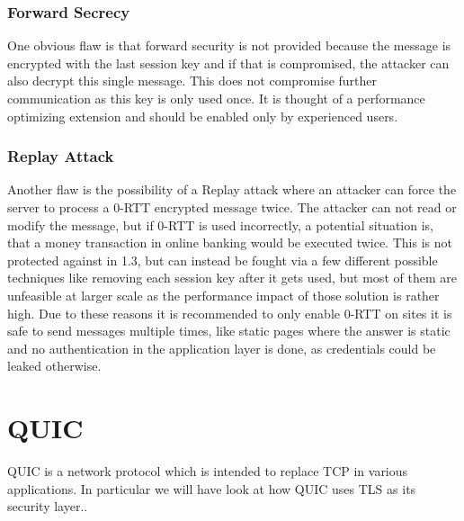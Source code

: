 \documentclass[a4paper,conference]{IEEEtran}
\begin{document}
\subsubsection{Forward Secrecy}
One obvious flaw is that forward security is not provided because the message is encrypted with the last session key and if that is compromised, the attacker can also decrypt this single message. This does not compromise further communication as this key is only used once.
It is thought of a performance optimizing extension and should be enabled only by experienced users.
\subsubsection{Replay Attack}
Another flaw is the possibility of a Replay attack where an attacker can force the server to process a 0-RTT encrypted message twice\cite{7961952}. The attacker can not read or modify the message, but if 0-RTT is used incorrectly, a potential situation is, that a money transaction in online banking would be executed twice. This is not protected against in 1.3, but can instead be fought via a few different possible techniques like removing each session key after it gets used, but most of them are unfeasible at larger scale as the performance impact of those solution is rather high\cite{rfc8446}.
Due to these reasons it is recommended to only enable 0-RTT on sites it is safe to send messages multiple times, like static pages where the answer is static and no authentication in the application layer is done, as credentials could be leaked otherwise\cite{rfc8446}.

\section{QUIC}
QUIC is a network protocol which is intended to replace TCP in various applications\cite{ietf-quic-transport-16}. In particular we will have look at how QUIC uses TLS as its security layer.\cite{ietf-quic-tls-16}.
\end{document}
